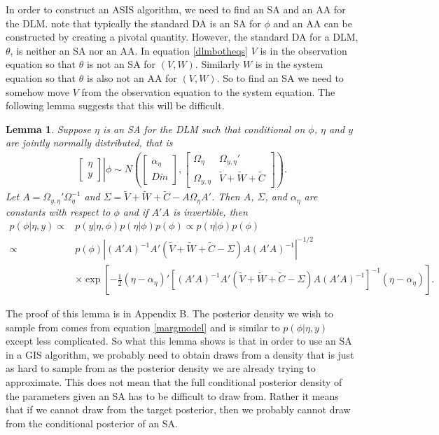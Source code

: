 \documentclass[12pt]{article}
\newtheorem{lem}{Lemma}
\begin{document}
In order to construct an ASIS algorithm, we need to find an SA and an AA for the DLM. \citet{papaspiliopoulos2007general} note that typically the standard DA is an SA for $\phi$ and an AA can be constructed by creating a pivotal quantity. However, the standard DA for a DLM, $\theta$, is neither an SA nor an AA. In equation \eqref{dlmbotheqs} $V$ is in the observation equation so that $\theta$ is not an SA for $(V,W)$. Similarly $W$ is in the system equation so that $\theta$ is also not an AA for $(V,W)$. So to find an SA we need to somehow move $V$ from the observation equation to the system equation. The following lemma suggests that this will be difficult.

\begin{lem}\label{noSA}
Suppose $\eta$ is an SA for the DLM such that conditional on $\phi$, $\eta$ and $y$ are jointly normally distributed, that is
\begin{align*}
 \left. \begin{bmatrix}\eta \\ y \end{bmatrix}\right|\phi \sim N\left(\begin{bmatrix} \alpha_\eta \\ D\tilde{m} \end{bmatrix}, \begin{bmatrix}
   \Omega_\eta & \Omega_{y,\eta}' \\
   \Omega_{y,\eta} & \tilde{V} + \tilde{W} + \tilde{C} \end{bmatrix}\right).
\end{align*}
Let $A=\Omega_{y,\eta}'\Omega_{\eta}^{-1}$ and $\Sigma = \tilde{V} + \tilde{W} + \tilde{C} - A\Omega_{\eta}A'$. Then $A$, $\Sigma$, and $\alpha_{\eta}$ are constants with respect to $\phi$ and if $A'A$ is invertible, then
\begin{align*}
p(\phi|\eta,y) \propto & p(y|\eta,\phi)p(\eta|\phi)p(\phi) \propto p(\eta|\phi)p(\phi) \\
\propto & p(\phi)|(A'A)^{-1}A'(\tilde{V} + \tilde{W} + \tilde{C} - \Sigma)A(A'A)^{-1}|^{-1/2}\\
&\times \exp\left[-\frac{1}{2}(\eta - \alpha_{\eta})'[(A'A)^{-1}A'(\tilde{V} + \tilde{W} + \tilde{C} - \Sigma)A(A'A)^{-1}]^{-1}(\eta - \alpha_{\eta})\right].
\end{align*}
\end{lem}
\noindent The proof of this lemma is in Appendix B. The posterior density we wish to sample from comes from equation \eqref{margmodel} and is similar to $p(\phi|\eta,y)$ except less complicated. So what this lemma shows is that in order to use an SA in a GIS algorithm, we probably need to obtain draws from a density that is just as hard to sample from as the posterior density we are already trying to approximate. This does not mean that the full conditional posterior density of the parameters given an SA has to be difficult to draw from. Rather it means that if we cannot draw from the target posterior, then we probably cannot draw from the conditional posterior of an SA.
\end{document}
